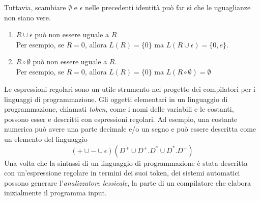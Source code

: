 \documentclass[12pt]{report}
\begin{document}
	Tuttavia, scambiare $\emptyset$ e $\epsilon$ nelle precedenti identità può far sì che le uguaglianze non siano vere.
	\begin{enumerate}
		\item $R\cup\epsilon$ può non essere uguale a $R$ \\
		Per esempio, se $R = 0$, allora $L(R) = \{0\}$ ma $L(R \cup \epsilon) = \{0, e\}$.
		\item $R \circ \emptyset$ può non essere uguale a $R$. \\
		Per esempio, se $R = 0$, allora $L(R) = \{0\}$ ma $L(R \circ \emptyset) = \emptyset$
	\end{enumerate}
	Le espressioni regolari sono un utile strumento nel progetto dei compilatori per i linguaggi di programmazione. Gli oggetti elementari in un linguaggio di programmazione, chiamati \textit{token}, come i nomi delle variabili e le costanti, possono esser e descritti con espressioni regolari. Ad esempio, una costante numerica può avere una parte decimale e/o un segno e può essere descritta come un elemento del linguaggio
	\[
	(+ \cup - \cup \epsilon)(D^+ \cup D^+.D^* \cup D^*.D^+)
	\]
	Una volta che la sintassi di un linguaggio di programmazione è stata descritta con un'espressione regolare in termini dei suoi token, dei sistemi automatici possono generare l'\textit{analizzatore lessicale}, la parte di un compilatore che elabora inizialmente il programma input.
\end{document}
